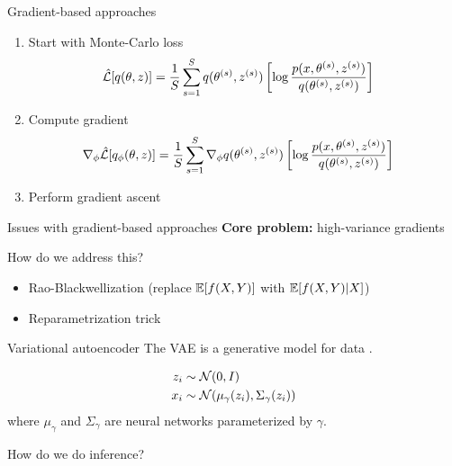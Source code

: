 \documentclass[10pt, compress]{beamer}
\begin{document}
\begin{frame}{Gradient-based approaches}
  \begin{enumerate}
    \item Start with Monte-Carlo loss
    \begin{align*}
      \hat{\mathcal{L}}[q(\theta, z)] &= \frac{1}{S}\sum_{s = 1}^S {q(\theta^{(s)}, z^{(s)})}\left[\log\frac{p(x, \theta^{(s)}, z^{(s)})}{q(\theta^{(s)}, z^{(s)})}\right]
    \end{align*}
    \item Compute gradient
    \begin{align*}
      \nabla_{\phi}\hat{\mathcal{L}}[q_\phi(\theta, z)] &= \frac{1}{S}\sum_{s = 1}^S \nabla_\phi{q(\theta^{(s)}, z^{(s)})}\left[\log\frac{p(x, \theta^{(s)}, z^{(s)})}{q(\theta^{(s)}, z^{(s)})}\right]
    \end{align*}
    \item Perform gradient ascent
  \end{enumerate}
\end{frame}

\begin{frame}{Issues with gradient-based approaches}
  \textbf{Core problem:}  high-variance gradients

  \pause

  How do we address this?

  \begin{itemize}
    \item Rao-Blackwellization (replace $\mathbb{E}[f(X, Y)]$ with $\mathbb{E}[f(X, Y) | X]$)\cite{blackbox}
    \item Reparametrization trick \cite{vae}
  \end{itemize}
\end{frame}

\begin{frame}{Variational autoencoder}
  The VAE is a generative model for data \cite{vae}.

  \begin{align*}
    z_i &\sim  \mathcal{N}(0, I) \\
    x_i &\sim  \mathcal{N}(\mu_\gamma(z_i), \Sigma_\gamma(z_i))
  \end{align*}
  where $\mu_\gamma$ and $\Sigma_\gamma$ are neural networks parameterized by $\gamma$.

  \pause
  \centering
  
  \pause
   
  How do we do inference?
\end{frame}
\end{document}

